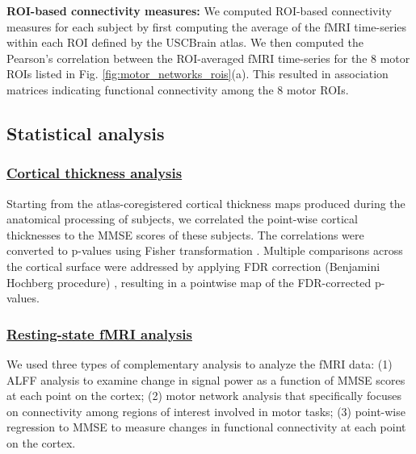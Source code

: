 \documentclass[review,3p,times,12pt,letterpaper]{elsarticle}
\begin{document}
\noindent\textbf{ROI-based connectivity measures:} 
We computed ROI-based connectivity measures for each subject by first computing the average of the fMRI time-series within each ROI defined by the USCBrain atlas. We then computed the Pearson's correlation between the ROI-averaged fMRI time-series for the 8 motor ROIs listed in Fig. \ref{fig:motor_networks_rois}(a). This resulted in association matrices indicating functional connectivity among the 8 motor ROIs.

\subsection*{Statistical analysis}
\label{sec:statanalysis}
\subsubsection*{\normalfont\underline{Cortical thickness analysis}}
\label{subsubsec:thickness}
 Starting from the atlas-coregistered cortical thickness maps produced during the anatomical processing of subjects, we correlated the point-wise cortical thicknesses to the MMSE scores of these subjects. The correlations were converted to p-values using Fisher transformation \cite{fisher1915frequency}. Multiple comparisons across the cortical surface were addressed by applying FDR correction (Benjamini Hochberg procedure) \cite{Benjamini_1995_Controlling_false_discovery}, resulting in a pointwise map of the FDR-corrected p-values. 

 
\subsubsection*{\normalfont\underline{Resting-state fMRI analysis}}

We used three types of complementary analysis to analyze the fMRI data: (1) ALFF analysis to examine change in signal power as a function of MMSE scores at each point on the cortex; (2) motor network analysis that specifically focuses on connectivity among regions of interest involved in motor tasks; (3) point-wise regression to MMSE to measure changes in functional connectivity at each point on the cortex.
\end{document}

